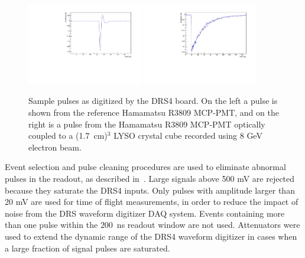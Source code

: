 \documentclass[12pt]{article}
\begin{document}
\begin{figure}[h] \centering
\includegraphics[width=0.45\textwidth]{figs/RefPulse} 
\includegraphics[width=0.45\textwidth]{figs/run064_event506} 
\caption{\small Sample pulses as digitized by the DRS4 board. 
On the left a pulse is shown from the reference Hamamatsu R3809 MCP-PMT, 
and on the right is a pulse from the Hamamatsu R3809 MCP-PMT
optically coupled to a (1.7~cm)$^{3}$ LYSO crystal cube
recorded using  8 GeV electron beam.} 
\label{fig:PulseShapes}
\end{figure}

Event selection and pulse cleaning procedures are used to eliminate abnormal
pulses in the readout, as described in~\cite{MCPFastCaloNIMA}. Large signals
above 500 mV are rejected because they saturate the DRS4 inputs. Only pulses
with amplitude larger than 20 mV are used for time of flight measurements, in
order to reduce the impact of noise from the DRS waveform digitizer DAQ system.
Events containing more than one pulse within the $200$~ns readout window are not
used. Attenuators were used to extend the dynamic range of the DRS4
waveform digitizer in cases when a large fraction of signal pulses are saturated.
\end{document}
